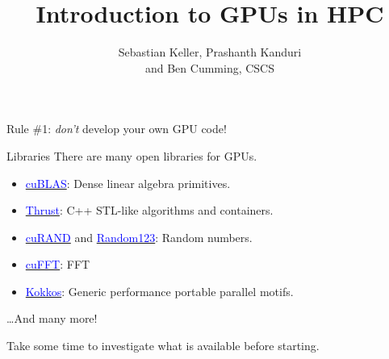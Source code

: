 \documentclass[aspectratio=43]{beamer}
\author{Sebastian Keller, Prashanth Kanduri\\ and Ben Cumming, CSCS}
\title{Introduction to GPUs in HPC}
\subtitle{}
\begin{document}
\cscstitle


\begin{frame}[fragile]{}
    \centering
    Rule \#1: \emph{don't} develop your own GPU code!
\end{frame}

\begin{frame}[fragile]{Libraries}
    There are many open libraries for GPUs.
    \begin{itemize}
        \item \href{https://developer.nvidia.com/cublas}{\textcolor{blue}{cuBLAS}}: Dense linear algebra primitives.
        \item \href{https://developer.nvidia.com/thrust}{\textcolor{blue}{Thrust}}: C++ STL-like algorithms and containers.
        \item \href{https://developer.nvidia.com/thrust}{\textcolor{blue}{cuRAND}} and \href{http://www.thesalmons.org/john/random123/releases/latest/docs/}{\textcolor{blue}{Random123}}: Random numbers.
        \item \href{https://developer.nvidia.com/cufft}{\textcolor{blue}{cuFFT}}: FFT
        \item \href{https://github.com/kokkos/kokkos}{\textcolor{blue}{Kokkos}}: Generic performance portable parallel motifs.
    \end{itemize}
    \dots And many more!

    \vspace{1cm}

    Take some time to investigate what is available before starting.
\end{frame}
\end{document}
